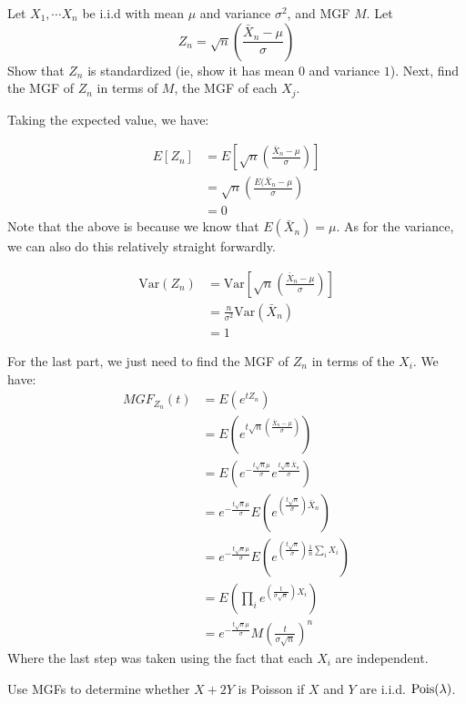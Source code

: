 \documentclass[11pt]{article}
\begin{document}
\begin{exercise}[B.H 6.17]
Let $X_1, \cdots X_n$ be i.i.d with mean $\mu$ and variance $\sigma^2$, and MGF $M$. Let
$$
Z_n = \sqrt{n}\left(\frac{\bar{X}_n - \mu}{\sigma} \right)
$$
Show that $Z_n$ is standardized (ie, show it has mean $0$ and variance $1$). Next, find the MGF of $Z_n$ in terms of $M$, the MGF of each $X_j$.
\end{exercise}

\pagebreak

\begin{solution}
Taking the expected value, we have:

\begin{align*}
E[Z_n] &= E\left[ \sqrt{n}\left(\frac{\bar{X}_n - \mu}{\sigma} \right)  \right] \\
&= \sqrt{n}\left(\frac{E(\bar{X}_n - \mu}{\sigma} \right) \\
&= 0
\end{align*}
Note that the above is because we know that $E(\bar{X}_n) = \mu$.
As for the variance, we can also do this relatively straight forwardly.

\begin{align*}
\text{Var}(Z_n) &= \text{Var}\left[\sqrt{n}\left(\frac{\bar{X}_n - \mu}{\sigma} \right)\right] \\
&= \frac{n}{\sigma^2}\text{Var}(\bar{X}_n) \\
&= 1
\end{align*}

For the last part, we just need to find the MGF of $Z_n$ in terms of the $X_i$. We have:
\begin{align*}
MGF_{Z_n}(t) &= E(e^{tZ_n}) \\
&= E(e^{t\sqrt{n}\left(\frac{\bar{X}_n - \mu}{\sigma} \right)}) \\
&= E(e^{-\frac{t\sqrt{n}\mu}{\sigma}}e^{\frac{t\sqrt{n}\bar{X}_n}{\sigma}}) \\
&= e^{-\frac{t\sqrt{n}\mu}{\sigma}} E(e^{\left(\frac{t\sqrt{n}}{\sigma} \right)\bar{X}_n}) \\
&=  e^{-\frac{t\sqrt{n}\mu}{\sigma}} E(e^{\left(\frac{t\sqrt{n}}{\sigma} \right)\frac{1}{n} \sum_{i}X_i})\\
&= E(\prod_i e^{\left(\frac{t}{\sigma\sqrt{n}} \right)X_i})\\
&= e^{-\frac{t\sqrt{n}\mu}{\sigma}}M(\frac{t}{\sigma\sqrt{n}})^n
\end{align*}
Where the last step was taken using the fact that each $X_i$ are independent.
\end{solution}
\pagebreak
\begin{exercise}
Use MGFs to determine whether $X + 2Y$ is Poisson if $X$ and $Y$ are i.i.d. $\textrm{Pois}(\lambda)$.
\end{exercise}
\end{document}
